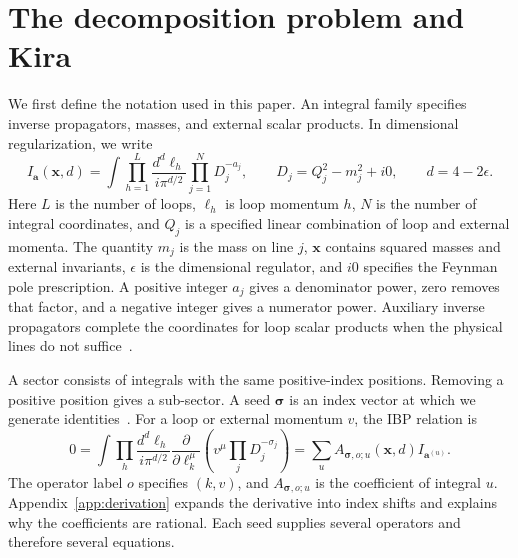 \documentclass[11pt,a4paper]{article}
\begin{document}
\section{The decomposition problem and Kira}
\label{sec:physics}
We first define the notation used in this paper. An integral family specifies inverse propagators, masses, and external scalar products. In dimensional regularization, we write~\cite{Weinzierl2022,KiraOriginal}
\begin{equation}
 I_{\boldsymbol a}(\boldsymbol x,d)=\int\prod_{h=1}^{L}
 \frac{d^d\ell_h}{i\pi^{d/2}}\prod_{j=1}^{N}D_j^{-a_j},
 \qquad D_j=Q_j^2-m_j^2+i0,\qquad d=4-2\epsilon.
 \label{eq:integral}
\end{equation}
Here $L$ is the number of loops, $\ell_h$ is loop momentum $h$, $N$ is the number of integral coordinates, and $Q_j$ is a specified linear combination of loop and external momenta. The quantity $m_j$ is the mass on line $j$, $\boldsymbol x$ contains squared masses and external invariants, $\epsilon$ is the dimensional regulator, and $i0$ specifies the Feynman pole prescription. A positive integer $a_j$ gives a denominator power, zero removes that factor, and a negative integer gives a numerator power. Auxiliary inverse propagators complete the coordinates for loop scalar products when the physical lines do not suffice~\cite{KiraOriginal}.

A sector consists of integrals with the same positive-index positions. Removing a positive position gives a sub-sector. A seed $\boldsymbol\sigma$ is an index vector at which we generate identities~\cite{KiraOriginal}. For a loop or external momentum $v$, the IBP relation is~\cite{ChetyrkinTkachov}
\begin{equation}
 0=\int\prod_h\frac{d^d\ell_h}{i\pi^{d/2}}
 \frac{\partial}{\partial\ell_k^\mu}
 \left(v^\mu\prod_jD_j^{-\sigma_j}\right)
 =\sum_u A_{\boldsymbol\sigma,o;u}(\boldsymbol x,d)
 I_{\boldsymbol a^{(u)}}.
 \label{eq:identity}
\end{equation}
The operator label $o$ specifies $(k,v)$, and $A_{\boldsymbol\sigma,o;u}$ is the coefficient of integral $u$. Appendix~\ref{app:derivation} expands the derivative into index shifts and explains why the coefficients are rational. Each seed supplies several operators and therefore several equations.
\end{document}
